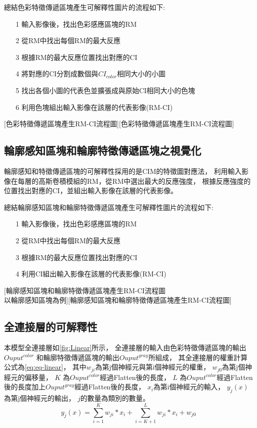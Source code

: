 \documentclass[class=NCU_thesis, crop=false]{standalone}
\begin{document}
	總結色彩特徵傳遞區塊產生可解釋性圖片的流程如下:
	\begin{itemize}
		\item [1]
		輸入影像後，找出色彩感應區塊的RM
		\item [2]
		從RM中找出每個RM的最大反應
		\item [3]
		根據RM的最大反應位置找出對應的CI
		\item [4]
		將對應的CI分割成數個與$CI_{color}$相同大小的小圖
		\item [5]
		找出各個小圖的代表色並擴張成與原始CI相同大小的色塊
		\item [6]
		利用色塊組出輸入影像在該層的代表影像(RM-CI)
	\end{itemize}

	[色彩特徵傳遞區塊產生RM-CI流程圖][色彩特徵傳遞區塊產生RM-CI流程圖]
	\pagebreak

	\subsection{輪廓感知區塊和輪廓特徵傳遞區塊之視覺化}
	輪廓感知和特徵傳遞區塊的可解釋性採用的是CIM的特徵圖對應法，
	利用輸入影像在每層的高斯卷積模組的RM，從RM中選出最大的反應強度，
	根據反應強度的位置找出對應的CI，並組出輸入影像在該層的代表影像。

	總結輪廓感知區塊和輪廓特徵傳遞區塊產生可解釋性圖片的流程如下:
	\begin{itemize}
		\item [1]
		輸入影像後，找出色彩感應區塊的RM
		\item [2]
		從RM中找出每個RM的最大反應
		\item [3]
		根據RM的最大反應位置找出對應的CI
		\item [4]
		利用CI組出輸入影像在該層的代表影像(RM-CI)
	\end{itemize}

	[輪廓感知區塊和輪廓特徵傳遞區塊產生RM-CI流程圖 \\ 
	以輪廓感知區塊為例][輪廓感知區塊和輪廓特徵傳遞區塊產生RM-CI流程圖]

\pagebreak

\subsection{全連接層的可解釋性}
本模型全連接層如\cref{fig:Linear}所示，
全連接層的輸入由色彩特徵傳遞區塊的輸出$Ouput^{color}$
和輪廓特徵傳遞區塊的輸出$Ouput^{gray}$所組成，
其全連接層的權重計算公式為\cref{eq:eq-linear}，
其中$w_{ji}$為第j個神經元與第i個神經元的權重，
$w_{j0}$為第j個神經元的偏移量，
$K$ 為$Ouput^{color}$經過Flatten後的長度，
$L$ 為$Ouput^{color}$經過Flatten後的長度加上$Ouput^{gray}$經過Flatten後的長度，
$x_{i}$為第i個神經元的輸入，
$y_{j}(x)$為第j個神經元的輸出，
$j$的數量為類別的數量。
\begin{equation}
    \label{eq:eq-linear}
    y_{j}(x) = \sum_{i=1}^{K}w_{ji} * x_{i} + \sum_{i=K+1}^{L}w_{ji} * x_{i} + w_{j0}
\end{equation}
\end{document}
